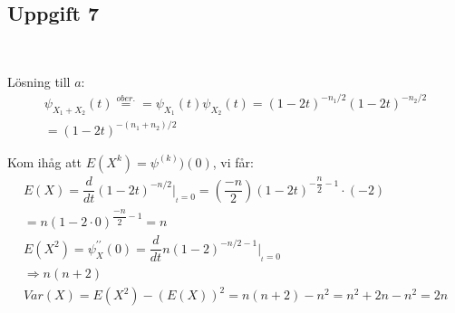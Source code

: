 \subsection{Uppgift 7}\hfill\\\par
\noindent Lösning till $a$:
\begin{equation*}
  \begin{gathered}
    \psi_{X_1+X_2}(t)\stackrel{ober.}{=} = \psi_{X_1}(t)\psi_{X_2}(t) = (1-2t)^{-n_1/2}(1-2t)^{-n_2/2}\\
    = (1-2t)^{-(n_1+n_2)/2}
  \end{gathered}
\end{equation*}
\par\bigskip
\noindent Kom ihåg att $E(X^k)= \psi^{(k)})(0)$, vi får:
\begin{equation*}
  \begin{gathered}
    E(X) = \dfrac{d}{dt}(1-2t)^{-n/2}|_{_t=0} = \left(\dfrac{-n}{2}\right)(1-2t)^{-\dfrac{n}{2}-1}\cdot(-2)\\
    = n(1-2\cdot0)^{\dfrac{-n}{2}-1} = n\\
    E(X^2) = \psi_X^{\prime\prime}(0)= \dfrac{d}{dt}n(1-2)^{-n/2-1}|_{_t=0}\\
    \Rightarrow n(n+2)\\
    Var(X)=E(X^2)-(E(X))^2 = n(n+2)-n^2 = n^2+2n-n^2=2n
  \end{gathered}
\end{equation*}
\par\bigskip
